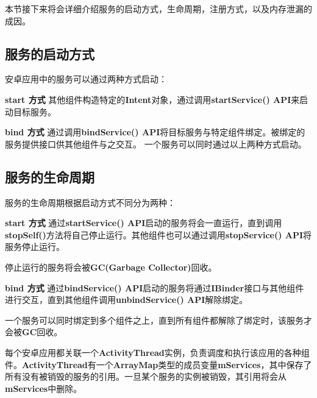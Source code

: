 本节接下来将会详细介绍服务的启动方式，生命周期，注册方式，以及内存泄漏的成因。

\subsection{服务的启动方式}
安卓应用中的服务可以通过两种方式启动\cite{service}：

\textbf{start 方式 } 其他组件构造特定的\textbf{Intent}对象，通过调用\textbf{startService() API}来启动目标服务。

\textbf{bind 方式 } 通过调用\textbf{bindService() API}将目标服务与特定组件绑定。被绑定的服务提供接口供其他组件与之交互。
一个服务可以同时通过以上两种方式启动。

\subsection{服务的生命周期}
服务的生命周期根据启动方式不同分为两种\cite{service}：

\textbf{start 方式 } 通过\textbf{startService() API}启动的服务将会一直运行，直到调用\textbf{stopSelf()}方法将自己停止运行。其他组件也可以通过调用\textbf{stopService() API}将服务停止运行。

停止运行的服务将会被\textbf{GC(Garbage Collector)}回收。

\textbf{bind 方式 } 通过\textbf{bindService() API}启动的服务将通过\textbf{IBinder}接口与其他组件进行交互，直到其他组件调用\textbf{unbindService() API}解除绑定。

一个服务可以同时绑定到多个组件之上，直到所有组件都解除了绑定时，该服务才会被\textbf{GC}回收。

每个安卓应用都关联一个\textbf{ActivityThread}实例，负责调度和执行该应用的各种组件。\textbf{ActivityThread}有一个\textbf{ArrayMap}类型的成员变量\textbf{mServices}，其中保存了所有没有被销毁的服务的引用。一旦某个服务的实例被销毁，其引用将会从\textbf{mServices}中删除。

